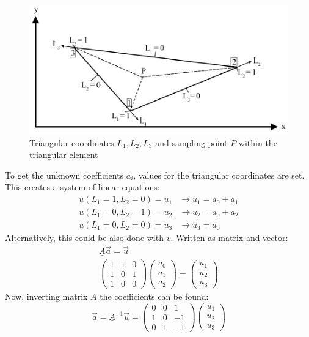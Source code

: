   \begin{figure}%
  	\centering
  	\includegraphics[width=0.9\linewidth]{figures/triangular_coords}
  	\caption{Triangular coordinates $L_1,L_2,L_3$ and sampling point $P$ within the triangular element}
  	\label{fig:tri_coords}
  \end{figure}
  To get the unknown coefficients $a_i$, values for the triangular coordinates are set. This creates a system of linear equations:
  \begin{align}
  u(L_1=1, L_2=0) = u_1 &\rightarrow u_1 = a_0 + a_1 \nonumber\\
  u(L_1=0, L_2=1) = u_2 &\rightarrow u_2 = a_0 + a_2 \nonumber\\
  u(L_1=0, L_2=0) = u_3 &\rightarrow u_3 = a_0
  \end{align}
  Alternatively, this could be also done with $v$. Written as matrix and vector:
  \begin{align}
  \underline{A} \vec{a} = \vec{u} \nonumber\\
  \begin{pmatrix}
  1 & 1 & 0\\
  1 & 0 & 1\\
  1 & 0 & 0
  \end{pmatrix} \begin{pmatrix}
  a_0 \\ a_1 \\ a_2
  \end{pmatrix} = \begin{pmatrix}
  u_1 \\ u_2 \\ u_3
  \end{pmatrix}
  \end{align}
  Now, inverting matrix $A$ the coefficients can be found:
  \begin{equation}\label{eq:t3_coeffsA}
  \vec{a} = \underline{A}^{-1} \vec{u} = \begin{pmatrix}
  0 & 0 & 1\\
  1 & 0 & -1\\
  0 & 1 & -1
  \end{pmatrix} \begin{pmatrix}
  u_1 \\ u_2 \\ u_3
  \end{pmatrix}
  \end{equation}
